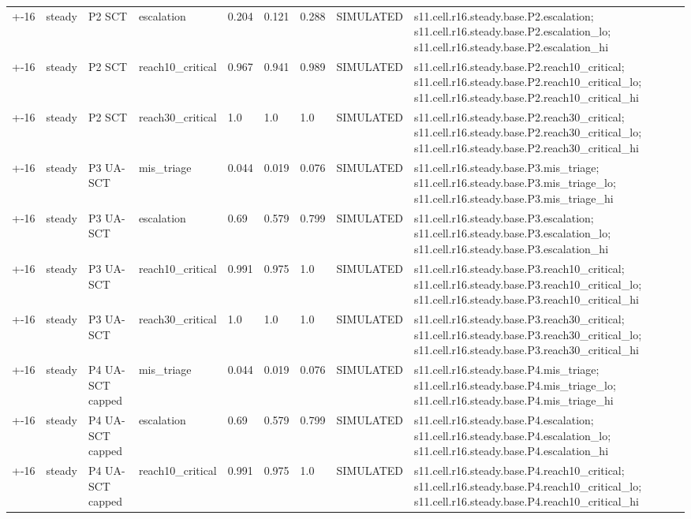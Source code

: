 \begin{table}[t]
\begin{tabular}{lllllllll}
+-16 & steady & P2 SCT & escalation & 0.204 & 0.121 & 0.288 & SIMULATED & s11.cell.r16.steady.base.P2.escalation; s11.cell.r16.steady.base.P2.escalation\_lo; s11.cell.r16.steady.base.P2.escalation\_hi \\
+-16 & steady & P2 SCT & reach10\_critical & 0.967 & 0.941 & 0.989 & SIMULATED & s11.cell.r16.steady.base.P2.reach10\_critical; s11.cell.r16.steady.base.P2.reach10\_critical\_lo; s11.cell.r16.steady.base.P2.reach10\_critical\_hi \\
+-16 & steady & P2 SCT & reach30\_critical & 1.0 & 1.0 & 1.0 & SIMULATED & s11.cell.r16.steady.base.P2.reach30\_critical; s11.cell.r16.steady.base.P2.reach30\_critical\_lo; s11.cell.r16.steady.base.P2.reach30\_critical\_hi \\
+-16 & steady & P3 UA-SCT & mis\_triage & 0.044 & 0.019 & 0.076 & SIMULATED & s11.cell.r16.steady.base.P3.mis\_triage; s11.cell.r16.steady.base.P3.mis\_triage\_lo; s11.cell.r16.steady.base.P3.mis\_triage\_hi \\
+-16 & steady & P3 UA-SCT & escalation & 0.69 & 0.579 & 0.799 & SIMULATED & s11.cell.r16.steady.base.P3.escalation; s11.cell.r16.steady.base.P3.escalation\_lo; s11.cell.r16.steady.base.P3.escalation\_hi \\
+-16 & steady & P3 UA-SCT & reach10\_critical & 0.991 & 0.975 & 1.0 & SIMULATED & s11.cell.r16.steady.base.P3.reach10\_critical; s11.cell.r16.steady.base.P3.reach10\_critical\_lo; s11.cell.r16.steady.base.P3.reach10\_critical\_hi \\
+-16 & steady & P3 UA-SCT & reach30\_critical & 1.0 & 1.0 & 1.0 & SIMULATED & s11.cell.r16.steady.base.P3.reach30\_critical; s11.cell.r16.steady.base.P3.reach30\_critical\_lo; s11.cell.r16.steady.base.P3.reach30\_critical\_hi \\
+-16 & steady & P4 UA-SCT capped & mis\_triage & 0.044 & 0.019 & 0.076 & SIMULATED & s11.cell.r16.steady.base.P4.mis\_triage; s11.cell.r16.steady.base.P4.mis\_triage\_lo; s11.cell.r16.steady.base.P4.mis\_triage\_hi \\
+-16 & steady & P4 UA-SCT capped & escalation & 0.69 & 0.579 & 0.799 & SIMULATED & s11.cell.r16.steady.base.P4.escalation; s11.cell.r16.steady.base.P4.escalation\_lo; s11.cell.r16.steady.base.P4.escalation\_hi \\
+-16 & steady & P4 UA-SCT capped & reach10\_critical & 0.991 & 0.975 & 1.0 & SIMULATED & s11.cell.r16.steady.base.P4.reach10\_critical; s11.cell.r16.steady.base.P4.reach10\_critical\_lo; s11.cell.r16.steady.base.P4.reach10\_critical\_hi \\

\end{tabular}
\end{table}

